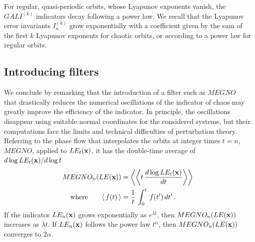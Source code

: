 For regular, quasi-periodic  orbits,  whose Lyapunov exponents vanish, the $GALI^{(k)}$ indicators decay following a power law. We recall that the Lyapunov error invariants $I_n^{(k)}$ grow exponentially with a coefficient given by the sum of the first $k$ Lyapunov exponents for chaotic orbits, or according to a power law for regular orbits. %

%
\subsection{Introducing filters}
%
We conclude by remarking that the introduction of a filter such as $MEGNO$~\cite{Gozdziewski01, Cincotta2016} that drastically reduces the numerical oscillations of the indicator of chaos may greatly improve the efficiency of the indicator. In principle, the oscillations disappear using suitable normal coordinates for the considered systems, but their computations face the limits and technical difficulties of perturbation theory. Referring to the phase flow that interpolates the orbits at integer times $t=n$, $MEGNO$, applied to $LE_t(\vb{x})$, it has the double-time average of $d\log LE_t(\vb{x})/d\log t$  %
%
\begin{equation}
\begin{split}
    MEGNO_n(LE(\vb{x})) & =  %
   \left\langle\left\langle  t\, \frac{d\log LE_t(\vb{x})}{ dt}\right \rangle \right \rangle\, \\
 \text{where} \qquad \mean{f(t)}& = \frac{1}{ t}\,\int_0^t \,f(t')\,dt' \, .
\end{split}
\label{eq3-23}
\end{equation}
%
If the indicator $LE_n(\vb{x})$ grows exponentially as $e^{\lambda t}$, then $MEGNO_n(LE(\vb{x}))$ increases as $\lambda t$. If $LE_n(\vb{x})$ follows the power law $t^\alpha$, then $MEGNO_n(LE(\vb{x}))$ converges to $2\alpha$.%

